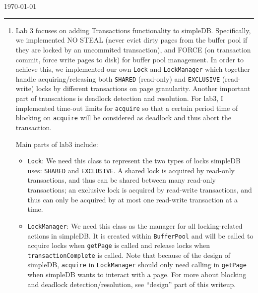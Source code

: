 \documentclass[10pt]{myland}
\begin{document}
\begin{center}
	{\Large {}} \\
	\vspace{.05in}
    \quad{}\\
	\vspace{.05in}
    \today \\
\end{center}
\vspace{.15in} \hrule \vspace{0.5em}%


\begin{enumerate}[label=\textbf{\arabic*.}, listparindent=0.0em, itemsep=2em]
	\item
	Lab 3 focuses on adding Transactions functionality to simpleDB. Specifically, we implemented NO STEAL (never evict
    dirty pages from the buffer pool if they are locked by an uncommited transaction), and FORCE (on transaction commit,
    force write pages to disk) for buffer pool management. In order to achieve this, we implemented our own
    \texttt{Lock} and \texttt{LockManager} which together handle acquiring/releasing both \texttt{SHARED} (read-only)
    and \texttt{EXCLUSIVE} (read-write) locks by different transactions on page granularity. Another important part of
    transcations is deadlock detection and resolution. For lab3, I implemented time-out limits for \texttt{acquire} so
    that a certain period time of blocking on \texttt{acquire} will be considered as deadlock and thus abort the
    transaction. \par

    Main parts of lab3 include:
	\begin{itemize}
        \item \texttt{Lock}: We need this class to represent the two types of locks simpleDB uses: \texttt{SHARED} and
            \texttt{EXCLUSIVE}. A shared lock is acquired by read-only transactions, and thus can be shared between
            many read-only transactions; an exclusive lock is acquired by read-write transactions, and thus can only be
            acquired by at most one read-write transaction at a time.

        \item \texttt{LockManager}: We need this class as the manager for all locking-related actions in simpleDB. It
            is created within \texttt{BufferPool} and will be called to acquire locks when \texttt{getPage} is called
            and release locks when \texttt{transactionComplete} is called. Note that because of the design of simpleDB,
            \texttt{acquire} in \texttt{LockManager} should only need calling in \texttt{getPage} when simpleDB wants to
            interact with a page. For more about blocking and deadlock detection/resolution, see ``design'' part of this
            writeup.


\end{itemize}
\end{enumerate}
\end{document}
